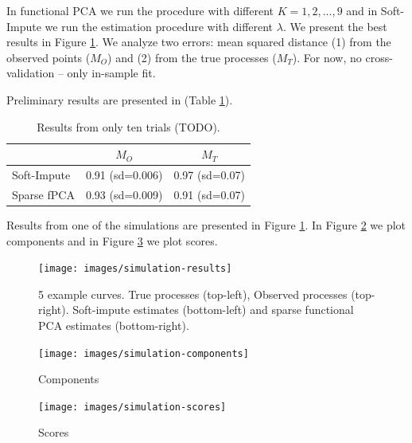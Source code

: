 \documentclass{article}
\begin{document}
In functional PCA we run the procedure with different $K = 1,2,...,9$ and in Soft-Impute we run the estimation procedure with different $\lambda$. We present the best results in Figure \ref{fig:results}. We analyze two errors: mean squared distance (1) from the observed points ($M_O$) and (2) from the true processes ($M_T$). For now, no cross-validation -- only in-sample fit.

Preliminary results are presented in (Table \ref{tab:results}).
\begin{table}[h]
  \centering
\begin{tabular}{lcc}
                  & $M_O$ & $M_T$\\
\hline
Soft-Impute  & 0.91 (sd=0.006) & 0.97 (sd=0.07)\\ 
Sparse fPCA & 0.93 (sd=0.009) & 0.91 (sd=0.07)\\
\end{tabular}
  \caption{Results from only ten trials (TODO).}\label{tab:results}
\end{table}

Results from one of the simulations are presented in Figure \ref{fig:results}. In Figure \ref{fig:components} we plot components and in Figure \ref{fig:scores} we plot scores.

\begin{figure}[h]
  \texttt{[image: images/simulation-results]}
  \caption{5 example curves. True processes (top-left), Observed processes (top-right). Soft-impute estimates (bottom-left) and sparse functional PCA estimates (bottom-right).}
  \label{fig:results}
\end{figure}

\begin{figure}[h]
  \texttt{[image: images/simulation-components]}
  \caption{Components}
  \label{fig:components}
\end{figure}

\begin{figure}[h]
  \texttt{[image: images/simulation-scores]}
  \caption{Scores}
  \label{fig:scores}
\end{figure}


\end{document}
